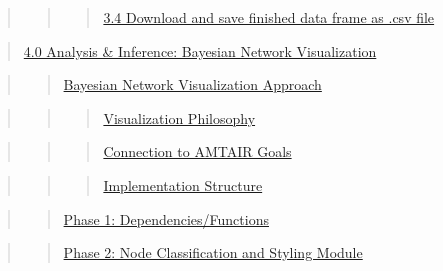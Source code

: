 \documentclass[
  letterpaper,
]{book}
\begin{document}
\begin{quote}
\begin{quote}
\begin{quote}
\hyperref[scrollTo=xTwPO_J-dahj]{3.4 Download and save finished data
frame as .csv file}
\end{quote}
\end{quote}
\end{quote}

\begin{quote}
\hyperref[scrollTo=t3zl7vKMECMg]{4.0 Analysis \& Inference: Bayesian
Network Visualization}
\end{quote}

\begin{quote}
\begin{quote}
\hyperref[scrollTo=t3zl7vKMECMg]{Bayesian Network Visualization
Approach}
\end{quote}
\end{quote}

\begin{quote}
\begin{quote}
\begin{quote}
\hyperref[scrollTo=t3zl7vKMECMg]{Visualization Philosophy}
\end{quote}
\end{quote}
\end{quote}

\begin{quote}
\begin{quote}
\begin{quote}
\hyperref[scrollTo=t3zl7vKMECMg]{Connection to AMTAIR Goals}
\end{quote}
\end{quote}
\end{quote}

\begin{quote}
\begin{quote}
\begin{quote}
\hyperref[scrollTo=t3zl7vKMECMg]{Implementation Structure}
\end{quote}
\end{quote}
\end{quote}

\begin{quote}
\begin{quote}
\hyperref[scrollTo=LSeSAPvtgIgU]{Phase 1: Dependencies/Functions}
\end{quote}
\end{quote}

\begin{quote}
\begin{quote}
\hyperref[scrollTo=byAExfek5yFU]{Phase 2: Node Classification and
Styling Module}
\end{quote}
\end{quote}
\end{document}
